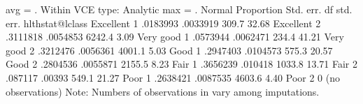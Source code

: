                                           avg     =          .
Within VCE type:     Analytic             max     =          .
{\smallskip}
                {\VBAR}                                          Normal
                {\VBAR} Proportion   Std. err.           df   std. err.
hlthstat@lclass {\VBAR}
   Excellent 1  {\VBAR}   .0183993   .0033919         309.7       32.68
   Excellent 2  {\VBAR}   .3111818   .0054853        6242.4        3.09
   Very good 1  {\VBAR}   .0573944   .0062471         234.4       41.21
   Very good 2  {\VBAR}   .3212476   .0056361        4001.1        5.03
        Good 1  {\VBAR}   .2947403   .0104573         575.3       20.57
        Good 2  {\VBAR}   .2804536   .0055871        2155.5        8.23
        Fair 1  {\VBAR}   .3656239    .010418        1033.8       13.71
        Fair 2  {\VBAR}    .087117     .00393         549.1       21.27
        Poor 1  {\VBAR}   .2638421   .0087535        4603.6        4.40
        Poor 2  {\VBAR}          0  (no observations)
Note: Numbers of observations in {} vary among imputations.
